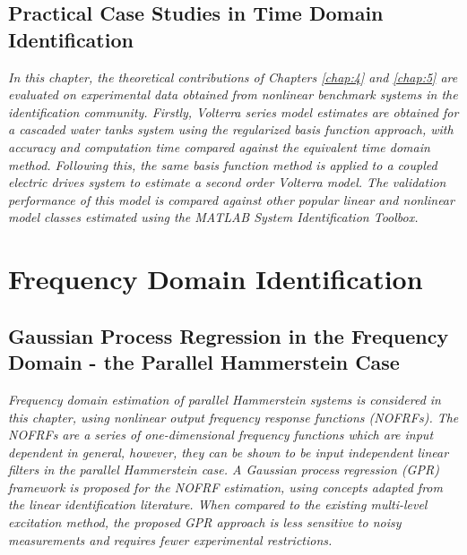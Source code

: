\documentclass[11pt,twoside]{report}
\begin{document}
\cleardoublepage
\chapter{Practical Case Studies in Time Domain Identification}
\label{chap:6}
\emph{In this chapter, the theoretical contributions of Chapters \ref{chap:4} and \ref{chap:5} are evaluated on experimental data obtained from nonlinear benchmark systems in the identification community. Firstly, Volterra series model estimates are obtained for a cascaded water tanks system using the regularized basis function approach, with accuracy and computation time compared against the equivalent time domain method. Following this, the same basis function method is applied to a coupled electric drives system to estimate a second order Volterra model. The validation performance of this model is compared against other popular linear and nonlinear model classes estimated using the MATLAB System Identification Toolbox.}
\newpage


\cleardoublepage
\part{Frequency Domain Identification}
\label{part:FD}

\cleardoublepage
\chapter{Gaussian Process Regression in the Frequency Domain - the Parallel Hammerstein Case}
\label{chap:7}
\emph{Frequency domain estimation of parallel Hammerstein systems is considered in this chapter, using nonlinear output frequency response functions (NOFRFs). The NOFRFs are a series of one-dimensional frequency functions which are input dependent in general, however, they can be shown to be input independent linear filters in the parallel Hammerstein case. A Gaussian process regression (GPR) framework is proposed for the NOFRF estimation, using concepts adapted from the linear identification literature. When compared to the existing multi-level excitation method, the proposed GPR approach is less sensitive to noisy measurements and requires fewer experimental restrictions.}
\newpage

\end{document}
